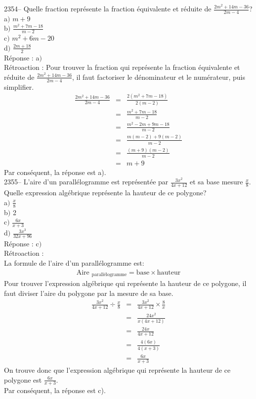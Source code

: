 \documentclass[letterpaper, 12pt]{article}
\begin{document}
2354-- Quelle fraction repr\'esente la fraction \'equivalente et r\'eduite de $\frac{2m^{2}+14m-36}{2m-4}$?\\

a$)$ $m+9$\\[2mm]
b$)$ $\frac{m^{2}+7m-18}{m-2}$\\[2mm]
c$)$ $m^{2}+6m-20$\\[2mm]
d$)$ $\frac{2m+18}{2}$\\

R\'eponse : a$)$\\

R\'etroaction :
Pour trouver la fraction qui repr\'esente la fraction \'equivalente et r\'eduite de $\frac{2m^{2}+14m-36}{2m-4}$, il faut factoriser le d\'enominateur et le num\'erateur, puis simplifier.
\begin{eqnarray*}
\frac{2m^{2}+14m-36}{2m-4}&=&\frac{2(m^{2}+7m-18)}{2(m-2)}\\[2mm]
&=&\frac{m^{2}+7m-18}{m-2}\\[2mm]
&=&\frac{m^{2}-2m+9m-18}{m-2}\\[2mm]
&=&\frac{m(m-2)+9(m-2)}{m-2}\\[2mm]
&=&\frac{(m+9)(m-2)}{m-2}\\[2mm]
&=&m+9
\end{eqnarray*}
Par cons\'equent, la r\'eponse est a).\\

2355-- L'aire d'un parall\'elogramme est repr\'esent\'ee par $\frac{3x^{2}}{4x+12}$ et sa base mesure $\frac{x}{8}$. Quelle expression alg\'ebrique repr\'esente la hauteur de ce polygone?\\

a$)$ $\frac{x}{8}$\\[2mm]
b$)$ 2\\[2mm]
c$)$ $\frac{6x}{x+3}$\\[2mm]
d$)$ $\frac{3x^{3}}{32x+96}$\\

R\'eponse : c$)$\\

R\'etroaction :\\
La formule de l'aire d'un parall\'elogramme est:
\begin{eqnarray*}
 \textrm{Aire $_{\textrm{parall\'elogramme}}$}=\textrm{base}\times\textrm{hauteur}
\end{eqnarray*}
Pour trouver l'expression alg\'ebrique qui repr\'esente la hauteur de ce polygone, il faut diviser l'aire du polygone par la mesure de sa base.
\begin{eqnarray*}
 \frac{3x^{2}}{4x+12}\div \frac{x}{8}&=&  \frac{3x^{2}}{4x+12}\times \frac{8}{x}\\[2mm]
&=&  \frac{24x^{2}}{x(4x+12)}\\[2mm]
&=&  \frac{24x}{4x+12}\\[2mm]
&=&  \frac{4(6x)}{4(x+3)}\\[2mm]
&=&  \frac{6x}{x+3}
\end{eqnarray*}
On trouve donc que l'expression alg\'ebrique qui repr\'esente la hauteur de ce polygone est $\frac{6x}{x+3}$.\\
Par cons\'equent, la r\'eponse est c).\\
\end{document}
